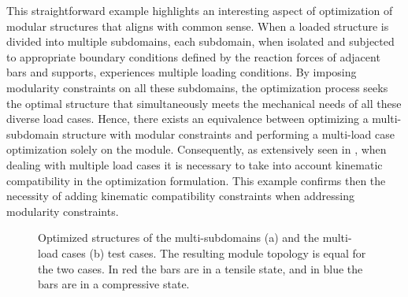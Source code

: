 This straightforward example highlights an interesting aspect of optimization of modular structures that aligns with common sense. When a loaded structure is divided into multiple subdomains, each subdomain, when isolated and subjected to appropriate boundary conditions defined by the reaction forces of adjacent bars and supports, experiences multiple loading conditions. By imposing modularity constraints on all these subdomains, the optimization process seeks the optimal structure that simultaneously meets the mechanical needs of all these diverse load cases. Hence, there exists an equivalence between optimizing a multi-subdomain structure with modular constraints and performing a multi-load case optimization solely on the module. Consequently, as extensively seen in , when dealing with multiple load cases it is necessary to take into account kinematic compatibility in the optimization formulation. This example confirms then the necessity of adding kinematic compatibility constraints when addressing modularity constraints.

\begin{figure}[]
    \hspace*{\fill}
    \hfill
    \hspace*{\fill}
    \caption{Optimized structures of the multi-subdomains (a) and the multi-load cases (b) test cases. The resulting module topology is equal for the two cases. In red the bars are in a tensile state, and in blue the bars are in a compressive state.}
    \label{fig:05_cell_multi_eq}
\end{figure}

